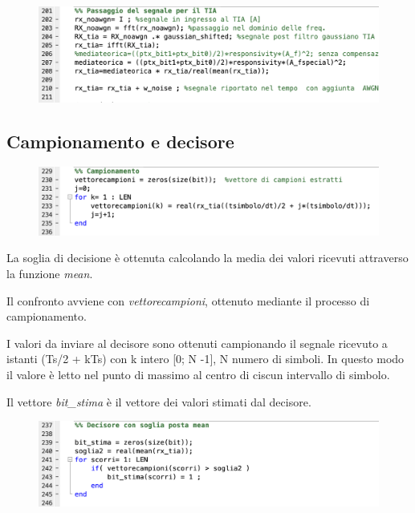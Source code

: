 \documentclass[12pt, a4paper]{article}
\begin{document}
\begin{figure}[h!]
\centering
\includegraphics[scale=0.7]{segnaletia.png}
\caption{}
\label{TIA}
\end{figure}


\newpage
\subsection{Campionamento e decisore}
\label{sub:campionamento}

\begin{figure}[h!]
\centering
\includegraphics[scale=0.7]{campionamento.png}
\caption{}
\label{}
\end{figure}

La soglia di decisione è ottenuta calcolando la media dei valori ricevuti attraverso la funzione \textit{mean}.

Il confronto avviene con \textit{vettorecampioni}, ottenuto mediante il processo di campionamento.

I valori da inviare al decisore sono ottenuti campionando il segnale ricevuto a istanti (Ts/2 + kTs) con k intero [0; N -1], N numero di simboli. In questo modo il valore è letto nel punto di massimo al centro di ciscun intervallo di simbolo.

Il vettore \textit{bit\_stima} è il vettore dei valori stimati dal decisore.

\begin{figure}[h!]
\centering
\includegraphics[scale=0.7]{decide.png}
\caption{}
\label{}
\end{figure}
\end{document}
